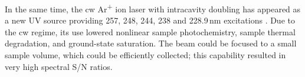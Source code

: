 In the same time, the cw Ar\textsuperscript{+} ion laser with intracavity
doubling has appeared as a new UV source providing 257, 248, 244, 238 and
228.9\,nm excitations
\parencite{%
	Asher1993b,%
	Russell1995%
}.
Due to the cw regime, its use lowered nonlinear sample photochemistry, sample
thermal degradation, and ground-state saturation.
The beam could be focused to a small sample volume, which could be efficiently
collected; this capability resulted in very high spectral S/N ratios.
